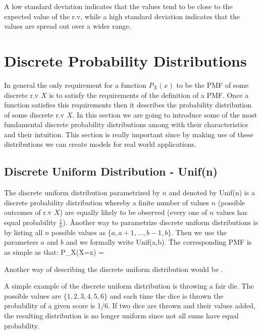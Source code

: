 A low standard deviation indicates that the values tend to be close to the expected value of the r.v, while a high
standard deviation indicates that the values are spread out over a wider range.

\section{Discrete Probability Distributions}

In general the only requirement for a function $P_{X}(x)$ to be the PMF of some discrete r.v $X$ is to satisfy the
requirements of the definition of a PMF. Once a function satisfies this requirements then it describes the
probability distribution of some discrete r.v $X$. In this section we are going to introduce some of the most
fundamental discrete probability distributions among with their characteristics and their intuition. This section is
really important since by making use of these distributions we can create models for real world applications.

\subsection{Discrete Uniform Distribution - Unif(n)}

The discrete uniform distribution parametrized by $n$ and denoted by Unif(n) is a discrete probability distribution
whereby a finite number of values $n$ (possible outcomes of r.v $X$) are equally likely to be observed (every one of
$n$ values has equal probability $\frac{1}{n}$). \v

Another way to parametrize discrete uniform distributions is by listing all $n$ possible values as $\{a, a+1, \ldots,
b-1, b\}$. Then we use the parameters $a$ and $b$ and we formally write Unif(a,b). \v

The corresponding PMF is as simple as that:
\bse
P_{X}(X=x) = 
\ese
\ed

Another way of describing the discrete uniform distribution would be .

\be
A simple example of the discrete uniform distribution is throwing a fair die. The possible values are $\{1, 2, 3, 4,
5, 6\}$ and each time the dice is thrown the probability of a given score is 1/6. If two dice are thrown and their
values added, the resulting distribution is no longer uniform since not all sums have equal probability.
\ee

